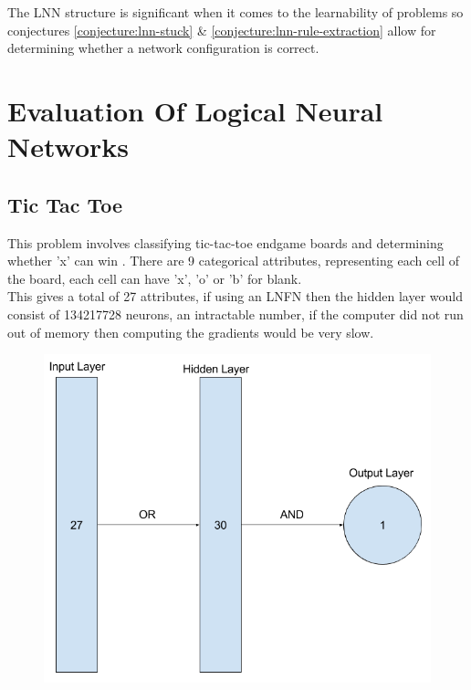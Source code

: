 The LNN structure is significant when it comes to the learnability of problems so conjectures \ref{conjecture:lnn-stuck} \& \ref{conjecture:lnn-rule-extraction} allow for determining whether a network configuration is correct.


\chapter{Evaluation Of Logical Neural Networks}
\section{Tic Tac Toe} \label{sec:lnn-ttt}
This problem involves classifying tic-tac-toe endgame boards and determining whether 'x' can win \cite{Lichman:2013}. There are 9 categorical attributes, representing each cell of the board, each cell can have 'x', 'o' or 'b' for blank.\\

This gives a total of 27 attributes, if using an LNFN then the hidden layer would consist of 134217728 neurons, an intractable number, if the computer did not run out of memory then computing the gradients would be very slow.

\begin{figure}[H]
	\centering
	\begin{minipage}[b]{0.5\textwidth}
		\includegraphics[width=\textwidth]{Tic-Tac-Toe-Net.png}
		\caption{}
		\label{fig:tic-tac-toe-net}
	\end{minipage}
	\hfill
\end{figure}

